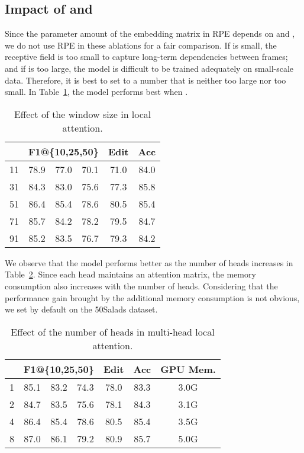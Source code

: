 \documentclass[letterpaper]{article} \usepackage[submission]{aaai23}  \usepackage{times}  \usepackage{helvet}  \usepackage{courier}  \usepackage[hyphens]{url}  \usepackage{graphicx} \urlstyle{rm} \def\UrlFont{\rm}  \usepackage{natbib}  \usepackage{caption} \frenchspacing  \setlength{\pdfpagewidth}{8.5in} \setlength{\pdfpageheight}{11in} \usepackage{algorithm}
\begin{document}
\subsection{Impact of  and }
Since the parameter amount of the embedding matrix  in RPE depends on  and , we do not use RPE in these ablations for a fair comparison. If  is small, the receptive field is too small to capture long-term dependencies between frames; and if  is too large, the model is difficult to be trained adequately on small-scale data. Therefore, it is best to set  to a number that is neither too large nor too small. In Table~\ref{tab:w}, the model performs best when . 

\begin{table}[ht]
\centering
\begin{tabular}{cccccc}
    \toprule
        & \multicolumn{3}{c}{F1@\{10,25,50\}} & Edit & Acc\\
    \midrule
    11 & 78.9 & 77.0 & 70.1 & 71.0 & 84.0\\
    31 & 84.3 & 83.0 & 75.6 & 77.3 & 85.8\\
    51 & 86.4 & 85.4 & 78.6 & 80.5 & 85.4\\
    71 & 85.7 & 84.2 & 78.2 & 79.5 & 84.7\\
    91 & 85.2 & 83.5 & 76.7 & 79.3 & 84.2\\
    \bottomrule
\end{tabular}
\caption{Effect of the window size  in local attention.}
\label{tab:w}
\end{table}

We observe that the model performs better as the number of heads  increases in Table~\ref{tab:h}. Since each head maintains an attention matrix, the memory consumption also increases with the number of heads. Considering that the performance gain brought by the additional memory consumption is not obvious, we set  by default on the 50Salads dataset.

\begin{table}[ht]
\centering
\begin{tabular}{ccccccc}
    \toprule
        & \multicolumn{3}{c}{F1@\{10,25,50\}} & Edit & Acc & GPU Mem.\\
    \midrule
    1 & 85.1 & 83.2 & 74.3 & 78.0 & 83.3 & 3.0G\\
    2 & 84.7 & 83.5 & 75.6 & 78.1 & 84.3 & 3.1G\\
    4 & 86.4 & 85.4 & 78.6 & 80.5 & 85.4 & 3.5G\\
    8 & 87.0 & 86.1 & 79.2 & 80.9 & 85.7 & 5.0G\\
    \bottomrule
\end{tabular}
\caption{Effect of the number of heads  in multi-head local attention.}
\label{tab:h}
\end{table}
\end{document}
